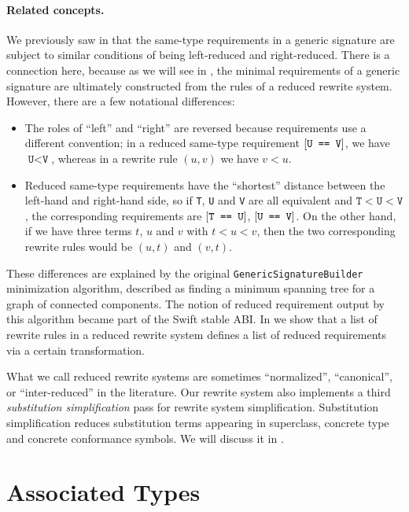 \documentclass[../generics]{subfiles}
\begin{document}
\paragraph{Related concepts.}
We previously saw in  that the same-type requirements in a generic signature are subject to similar conditions of being left-reduced and right-reduced. There is a connection here, because as we will see in , the minimal requirements of a generic signature are ultimately constructed from the rules of a reduced rewrite system. However, there are a few notational differences:
\begin{itemize}
\item The roles of ``left'' and ``right'' are reversed because requirements use a different convention; in a reduced same-type requirement $[\texttt{U == V}]$, we have $\texttt{U} < \texttt{V}$, whereas in a rewrite rule $(u, v)$ we have $v<u$.
\item Reduced same-type requirements have the ``shortest'' distance between the left-hand and right-hand side, so if \texttt{T}, \texttt{U} and \texttt{V} are all equivalent and $\texttt{T}<\texttt{U}<\texttt{V}$, the corresponding requirements are $[\texttt{T == U}]$, $[\texttt{U == V}]$. On the other hand, if we have three terms $t$, $u$ and $v$ with $t<u<v$, then the two corresponding rewrite rules would be $(u, t)$ and $(v, t)$.
\end{itemize}
These differences are explained by the original \texttt{GenericSignatureBuilder} minimization algorithm, described as finding a minimum spanning tree for a graph of connected components. The notion of reduced requirement output by this algorithm became part of the Swift stable ABI. In  we show that a list of rewrite rules in a reduced rewrite system defines a list of reduced requirements via a certain transformation.
 
What we call reduced rewrite systems are sometimes ``normalized'', ``canonical'', or ``inter-reduced'' in the literature. Our rewrite system also implements a third \emph{substitution simplification} pass for rewrite system simplification. Substitution simplification reduces substitution terms appearing in superclass, concrete type and concrete conformance symbols. We will discuss it in .

\section{Associated Types}\label{critical pairs}
\end{document}
